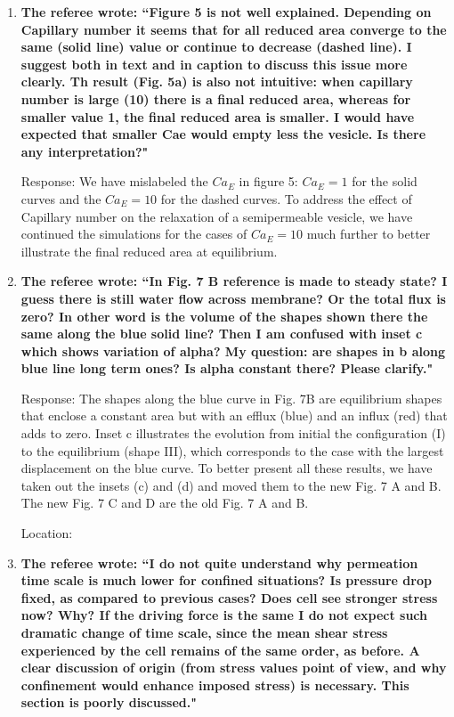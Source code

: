 \documentclass[12pt]{article}
\begin{document}
\begin{enumerate}
\item {\bf 
The referee wrote:
``Figure 5 is not well explained. Depending on Capillary number it
seems that for all reduced area converge to the same (solid line)
value or continue to decrease (dashed line). I suggest both in text
and in caption to discuss this issue more clearly. Th result (Fig. 5a)
is also not intuitive: when capillary number is large (10) there is a
final reduced area, whereas for smaller value 1, the final reduced
area is smaller. I would have expected that smaller Cae would empty
less the vesicle. Is there any interpretation?"}

\noindent
Response: We have mislabeled the $Ca_E$ in figure 5:  $Ca_E=1$ for the solid curves and the $Ca_E=10$ for the dashed curves. To address the effect of Capillary number on the relaxation of a semipermeable vesicle, we have continued the simulations for the cases of $Ca_E = 10$ much further to better illustrate the final reduced area at equilibrium.

\item{\bf
The referee wrote:
``In Fig. 7 B reference is made to steady state? I guess there is
still water flow across membrane? Or the total flux is zero? In other
word is the volume of the shapes shown there the same along the blue
solid line? Then I am confused with inset c which shows variation of
alpha? My question: are shapes in b along blue line long term ones? Is
alpha constant there? Please clarify."}

\noindent
Response: The shapes along the blue curve in Fig. 7B are equilibrium shapes that enclose a constant area but with an efflux (blue) and an influx (red) that adds to zero. Inset c illustrates the evolution from initial  the configuration (I) to the equilibrium (shape III), which corresponds to the case with the largest displacement on the blue curve. To better present all these results, we have taken out the insets (c) and (d) and moved them to the new Fig. 7 A and B. The new Fig. 7 C and D are the old Fig.  7 A and B.

\noindent
Location:

\item{\bf
The referee wrote:
``I do not quite understand why permeation time scale is much lower
for confined situations? Is pressure drop fixed, as compared to
previous cases? Does cell see stronger stress now? Why? If the driving
force is the same I do not expect such dramatic change of time scale,
since the mean shear stress experienced by the cell remains of the
same order, as before. A clear discussion of origin (from stress
values point of view, and why confinement would enhance imposed
stress) is necessary. This section is poorly discussed."}


\end{enumerate}
\end{document}
